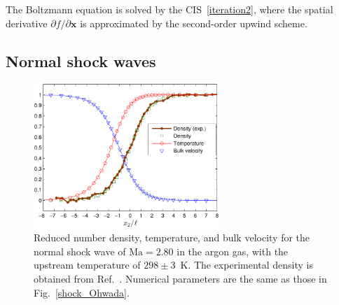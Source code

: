 The Boltzmann equation is solved by the CIS~\eqref{iteration2}, where the spatial derivative ${\partial {f}}/{\partial\bm{x}}$ is approximated by the second-order upwind scheme.



\subsection{Normal shock waves}

\begin{figure}[t]
	\centering
	\includegraphics[width=7cm]{Chapter4/IMG/shock_exp.pdf}
	\caption{
		Reduced number density, temperature, and bulk velocity for the normal shock wave of $\text{Ma}=2.80$ in the argon gas, with the upstream temperature of $298\pm3$~K. The experimental density is obtained from Ref.~\cite{Kowalczyk2008}. Numerical parameters are the same as those in Fig.~\ref{shock_Ohwada}.
	}
	\label{shock_exp}
\end{figure}

